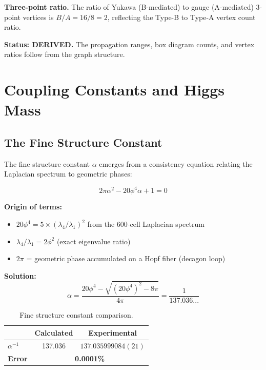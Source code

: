 \documentclass[12pt,a4paper]{article}
\begin{document}
\textbf{Three-point ratio.} The ratio of Yukawa (B-mediated) to gauge (A-mediated) 3-point vertices is $B/A = 16/8 = 2$, reflecting the Type-B to Type-A vertex count ratio.

\textbf{Status: DERIVED.} The propagation ranges, box diagram counts, and vertex ratios follow from the graph structure.


\section{Coupling Constants and Higgs Mass}

\subsection{The Fine Structure Constant}

The fine structure constant $\alpha$ emerges from a consistency equation relating the Laplacian spectrum to geometric phases:

\begin{equation}
\boxed{2\pi\alpha^2 - 20\phi^4\alpha + 1 = 0}
\end{equation}

\textbf{Origin of terms:}
\begin{itemize}
    \item $20\phi^4 = 5 \times (\lambda_4/\lambda_1)^2$ from the 600-cell Laplacian spectrum
    \item $\lambda_4/\lambda_1 = 2\phi^2$ (exact eigenvalue ratio)
    \item $2\pi$ = geometric phase accumulated on a Hopf fiber (decagon loop)
\end{itemize}

\textbf{Solution:}
\begin{equation}
\alpha = \frac{20\phi^4 - \sqrt{(20\phi^4)^2 - 8\pi}}{4\pi} = \frac{1}{137.036...}
\end{equation}

\begin{table}[H]
\centering
\begin{tabular}{lcc}
\toprule
& \textbf{Calculated} & \textbf{Experimental \cite{codata2022}} \\
\midrule
$\alpha^{-1}$ & 137.036 & $137.035999084(21)$ \\
\textbf{Error} & \multicolumn{2}{c}{\textbf{0.0001\%}} \\
\bottomrule
\end{tabular}
\caption{Fine structure constant comparison.}
\end{table}
\end{document}
